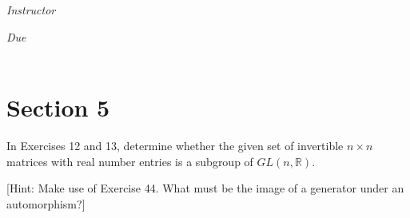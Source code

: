 \documentclass[12pt, oneside]{book}
\begin{document}
\begin{titlepage}
\begin{center}
\begin{large}
            \vspace*{1\baselineskip}

            \textit{Instructor} \\[1ex] %
            \professor

            \vspace*{1\baselineskip}

            \textit{Due}\\[1ex]
            {\scshape  \finaldate} \\[0.3\baselineskip] %

            \thispagestyle{empty}

        \end{large}
    \end{center}
\end{titlepage}
\section*{Section 5}


In Exercises 12 and 13, determine whether the given set of invertible \(n \times n\) matrices with real number entries is a subgroup of \(GL(n, \mathbb{R})\).

[Hint: Make use of Exercise 44. What must be the image of a generator under an automorphism?]
\end{document}
